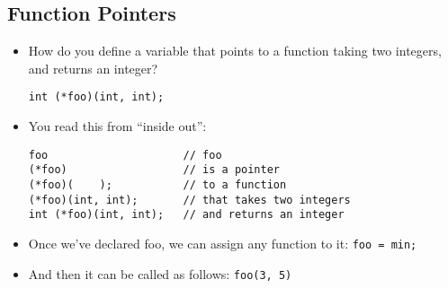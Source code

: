 \subsection{Function Pointers}
\begin{itemize}
	\item How do you define a variable that points to a function taking two integers, and returns an integer?
\begin{lstlisting}[style=C++]
int (*foo)(int, int);
\end{lstlisting}
	\item You read this from ``inside out'':
\begin{lstlisting}[style=C++]
foo						// foo
(*foo)					// is a pointer
(*foo)(    );			// to a function
(*foo)(int, int);		// that takes two integers
int (*foo)(int, int);	// and returns an integer
\end{lstlisting}
	\item Once we've declared foo, we can assign any function to it: \lstinline[style=C++]{foo = min;}
	\item And then it can be called as follows: \lstinline[style=C++]{foo(3, 5)}
\end{itemize}